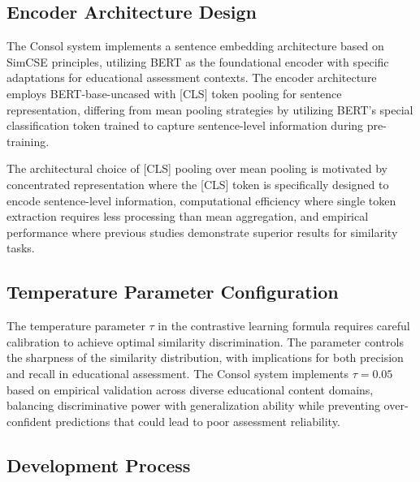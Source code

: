 {\color{maroon}
\subsection{Encoder Architecture Design}

The Consol system implements a sentence embedding architecture based on SimCSE principles, utilizing BERT as the foundational encoder with specific adaptations for educational assessment contexts. The encoder architecture employs BERT-base-uncased with [CLS] token pooling for sentence representation, differing from mean pooling strategies by utilizing BERT's special classification token trained to capture sentence-level information during pre-training.

The architectural choice of [CLS] pooling over mean pooling is motivated by concentrated representation where the [CLS] token is specifically designed to encode sentence-level information, computational efficiency where single token extraction requires less processing than mean aggregation, and empirical performance where previous studies demonstrate superior results for similarity tasks.

\subsection{Temperature Parameter Configuration}

The temperature parameter $\tau$ in the contrastive learning formula requires careful calibration to achieve optimal similarity discrimination. The parameter controls the sharpness of the similarity distribution, with implications for both precision and recall in educational assessment. The Consol system implements $\tau = 0.05$ based on empirical validation across diverse educational content domains, balancing discriminative power with generalization ability while preventing over-confident predictions that could lead to poor assessment reliability.
}

\subsection{Development Process}


